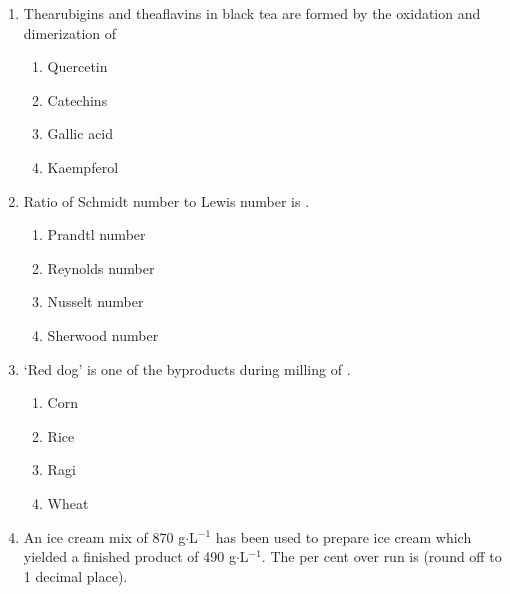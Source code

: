 \documentclass[journal,12pt,onecolumn]{IEEEtran}
\begin{document}
\begin{enumerate}[label=\arabic*)]
\vspace{0.5cm}

\item Thearubigins and theaflavins in black tea are formed by the oxidation and dimerization of
\hfill{} \\

\vspace{0.2cm}
\begin{enumerate}[label=\alph*)]
\item Quercetin
\item Catechins
\item Gallic acid
\item Kaempferol
\end{enumerate}

\vspace{0.5cm}

\item Ratio of Schmidt number to Lewis number is \underline{\hspace{2cm}}.
\hfill{} \\

\vspace{0.2cm}
\begin{enumerate}[label=\alph*)]
\item Prandtl number
\item Reynolds number
\item Nusselt number
\item Sherwood number
\end{enumerate}

\newpage

\item `Red dog' is one of the byproducts during milling of \underline{\hspace{2cm}}.
\hfill{} \\

\vspace{0.2cm}
\begin{enumerate}[label=\alph*)]
\item Corn
\item Rice
\item Ragi
\item Wheat
\end{enumerate}

\vspace{0.5cm}

\item An ice cream mix of 870 g$\cdot$L$^{-1}$ has been used to prepare ice cream which yielded a finished product of 490 g$\cdot$L$^{-1}$. The per cent over run is \underline{\hspace{2cm}} (round off to 1 decimal place).
\hfill{} \\


\end{enumerate}
\end{document}
